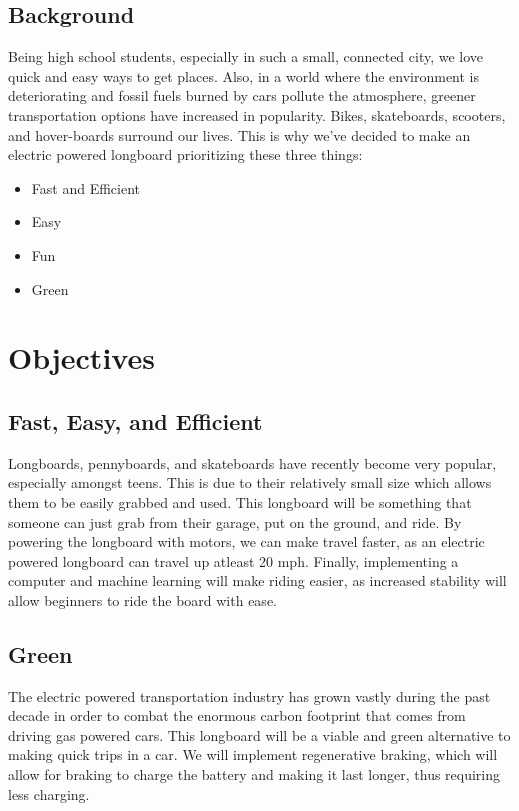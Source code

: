 \documentclass{article}
\begin{document}
\subsection{Background}
Being high school students, especially in such a small, connected city, we love quick and easy ways to get places. Also, in a world where the environment is deteriorating and fossil fuels burned by cars pollute the atmosphere, greener transportation options have increased in popularity. Bikes, skateboards, scooters, and hover-boards surround our lives. This is why we've decided to make an electric powered longboard prioritizing these three things:
\begin{itemize}
  \item Fast and Efficient
  \item Easy
  \item Fun
  \item Green
\end{itemize}

\section{Objectives}
\subsection{Fast, Easy, and Efficient}
Longboards, pennyboards, and skateboards have recently become very popular, especially amongst teens. This is due to their relatively small size which allows them to be easily grabbed and used. This longboard will be something that someone can just grab from their garage, put on the ground, and ride. By powering the longboard with motors, we can make travel faster, as an electric powered longboard can travel up atleast 20 mph. Finally, implementing a computer and machine learning will make riding easier, as increased stability will allow beginners to ride the board with ease.
\subsection{Green}
The electric powered transportation industry has grown vastly during the past decade in order to combat the enormous carbon footprint that comes from driving gas powered cars. This longboard will be a viable and green alternative to making quick trips in a car. We will implement regenerative braking, which will allow for braking to charge the battery and making it last longer, thus requiring less charging.
\end{document}
